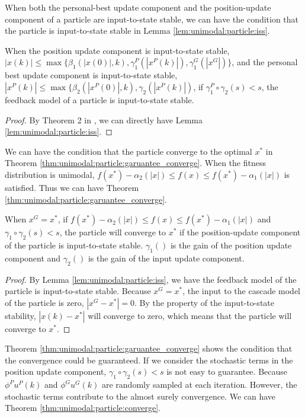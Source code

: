 When both the personal-best update component and the position-update component of a particle are input-to-state stable, we can have the condition that the particle is input-to-state stable in Lemma \ref{lem:unimodal:particle:iss}.

\begin{mylem}
\label{lem:unimodal:particle:iss}
When the position update component is input-to-state stable,
$ | x (k) | \leq \max \{ \beta_{1} (| x(0) |, k ), \gamma^{P}_{1} ( | x^{P} (k) | ), \gamma^{G}_{1} ( | x^{G} | ) \} $,
and the personal best update component is input-to-state stable,
$ | x^{P} (k) | \leq \max \{ \beta_{2} (| x^{P}(0) |, k ), \gamma_{2} ( | x^{P} (k) | ) $,
if $ \gamma^{P}_{1} \circ \gamma_{2} (s)  < s $, the feedback model of a particle is input-to-state stable.
\begin{proof}
By Theorem 2 in \cite{Jiang2001857}, we can directly have Lemma \ref{lem:unimodal:particle:iss}.
\end{proof}
\end{mylem}

We can have the condition that the particle converge to the optimal $ x^{*} $ in Theorem \ref{thm:unimodal:particle:garuantee_converge}.
When the fitness distribution is unimodal, $ f(x^{*}) - \alpha_{2} ( |x| ) \leq  f(x) \leq f(x^{*}) - \alpha_{1} ( |x| ) $ is satisfied.
Thus we can have Theorem \ref{thm:unimodal:particle:garuantee_converge}.

\begin{mythm}
\label{thm:unimodal:particle:garuantee_converge}
When $ x^{G} = x^{*} $,  if $ f(x^{*}) - \alpha_{2} ( |x| ) \leq  f(x) \leq f(x^{*}) - \alpha_{1} ( |x| ) $ and $ \gamma_{1} \circ \gamma_{2} (s)  < s $, the particle will converge to $ x^{*} $ if the position-update component of the particle is input-to-state stable.
$ \gamma_{1} () $ is the gain of the position update component and $ \gamma_{2} () $ is the gain of the input update component.
\begin{proof}
By Lemma \ref{lem:unimodal:particle:iss}, we have the feedback model of the particle is input-to-state stable.
Because $ x^{G} = x^{*} $, the input to the cascade model of the particle is zero, $ | x^{G} - x^{*} | = 0 $.
By the property of the input-to-state stability, $ | x(k) - x^{*} | $ will converge to zero, which means that the particle will converge to $ x^{*} $.
\end{proof}
\end{mythm}

Theorem \ref{thm:unimodal:particle:garuantee_converge} shows the condition that the convergence could be guaranteed.
If we consider the stochastic terms in the position update component, $ \gamma_{1} \circ \gamma_{2} (s)  < s $ is not easy to guarantee.
Because $ \phi^{P} u^{P} (k) $ and $ \phi^{G} u^{G} (k) $ are randomly sampled at each iteration.
However, the stochastic terms contribute to the almost surely convergence.
We can have Theorem \ref{thm:unimodal:particle:converge}.

